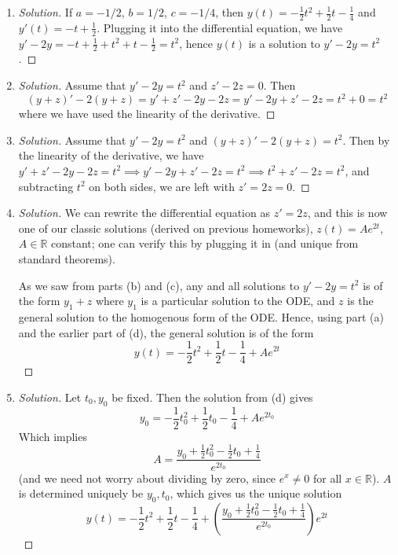 \documentclass{article}
\newcommand{\R}{{\mathbb R}}
\begin{document}
\begin{enumerate}
	\item \begin{proof}[Solution]\let\qed\relax
		If $a = -1/2$, $b = 1/2$, $c = -1/4$,
		then $y(t) = -\frac12 t^2 + \frac12 t - \frac14$ and
		$y'(t) = - t + \frac{1}{2}$.
		Plugging it into the differential equation, we have
		$y' - 2y = - t + \frac12 + t^2 + t - \frac12 = t^2$,
		hence $y(t)$ is a solution to $y' - 2y = t^2$.
	\end{proof}
	\item \begin{proof}[Solution]\let\qed\relax
		Assume that $y' - 2y = t^2$ and $z' - 2z = 0$.
		Then
		\[
			(y+z)' - 2(y+z)
			= y' + z' - 2y - 2z
			= y' - 2y + z' - 2z = t^2 + 0 = t^2
		\]
		where we have used the linearity of the derivative.
	\end{proof}
	\item \begin{proof}[Solution]\let\qed\relax
		Assume that $y' - 2y = t^2$ and $(y+z)' - 2(y+z) = t^2$.
		Then by the linearity of the derivative, we have
		$y' + z' - 2y - 2z = t^2 \implies y' - 2y + z' - 2z = t^2
		\implies t^2 + z' - 2z = t^2$,
		and subtracting $t^2$ on both sides, we are left with
		$z' = 2z = 0$.
	\end{proof}
	\item \begin{proof}[Solution]\let\qed\relax
		We can rewrite the differential equation as $z' = 2z$,
		and this is now one of our classic solutions (derived on previous homeworks),
		$z(t) = Ae^{2t}$, $A \in \R$ constant;
		one can verify this by plugging it in (and unique from standard theorems).
		
		As we saw from parts (b) and (c),
		any and all solutions to $y' - 2y = t^2$
		is of the form $y_1 + z$ where $y_1$ is a particular solution to the ODE,
		and $z$ is the general solution to the homogenous form of the ODE.
		Hence, using part (a) and the earlier part of (d),
		the general solution is of the form
		\[
			y(t) = -\frac12 t^2 + \frac12 t - \frac14 + Ae^{2t}
		\]
	\end{proof}
	\item \begin{proof}[Solution]\let\qed\relax
		Let $t_0,y_0$ be fixed. Then the solution from (d) gives
		\[
			y_0 = -\frac12 t_0^2 + \frac12 t_0 - \frac14 + Ae^{2t_0}
		\]
		Which implies
		\[
			A = \frac{y_0 + \frac12 t_0^2 - \frac12 t_0 + \frac14}{e^{2t_0}}
		\]
		(and we need not worry about dividing by zero,
		since $e^x \neq 0$ for all $x \in \R$).
		$A$ is determined uniquely be $y_0,t_0$, which gives us the unique solution
		\[
			y(t) = -\frac12 t^2 + \frac12 t - \frac14 +
			\left(\frac{y_0 + \frac12 t_0^2 - \frac12 t_0 + \frac14}{e^{2t_0}}\right)e^{2t}
		\]
	\end{proof}
\end{enumerate}
\end{document}
